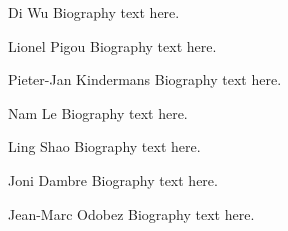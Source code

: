 

\begin{IEEEbiographynophoto}{Di Wu}
Biography text here.
\end{IEEEbiographynophoto}

\begin{IEEEbiographynophoto}{Lionel Pigou}
Biography text here.
\end{IEEEbiographynophoto}

\begin{IEEEbiographynophoto}{Pieter-Jan Kindermans}
Biography text here.
\end{IEEEbiographynophoto}


\begin{IEEEbiographynophoto}{ Nam Le}
Biography text here.
\end{IEEEbiographynophoto}


\begin{IEEEbiographynophoto}{Ling Shao}
Biography text here.
\end{IEEEbiographynophoto}


\begin{IEEEbiographynophoto}{ Joni Dambre}
Biography text here.
\end{IEEEbiographynophoto}


\begin{IEEEbiographynophoto}{Jean-Marc Odobez}
Biography text here.
\end{IEEEbiographynophoto}





\endinput
